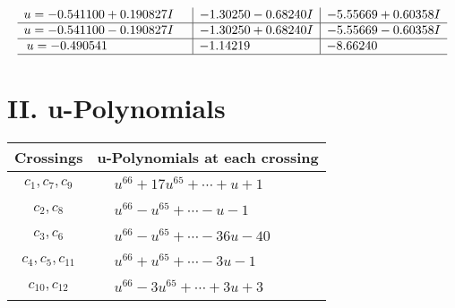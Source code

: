 \documentclass[1p]{elsarticle_modified}
\theoremstyle{definition}
\begin{document}
$$\begin{array}{c|c|c}
\begin{aligned}
u &= -0.541100 + 0.190827 I\end{aligned}
 & -1.30250 - 0.68240 I & -5.55669 + 0.60358 I \\ \hline\begin{aligned}
u &= -0.541100 - 0.190827 I\end{aligned}
 & -1.30250 + 0.68240 I & -5.55669 - 0.60358 I \\ \hline\begin{aligned}
u &= -0.490541\phantom{ +0.000000I}\end{aligned}
 & -1.14219\phantom{ +0.000000I} & -8.66240\phantom{ +0.000000I}\\
 \hline 
 \end{array}$$\newpage
\newpage\renewcommand{\arraystretch}{1}
\centering \section*{ II. u-Polynomials}
\begin{tabular}{m{50pt}|m{274pt}}
Crossings & \hspace{64pt}u-Polynomials at each crossing \\
\hline $$\begin{aligned}c_{1},c_{7},c_{9}\end{aligned}$$&$\begin{aligned}
&u^{66}+17 u^{65}+\cdots+u+1
\end{aligned}$\\
\hline $$\begin{aligned}c_{2},c_{8}\end{aligned}$$&$\begin{aligned}
&u^{66}- u^{65}+\cdots- u-1
\end{aligned}$\\
\hline $$\begin{aligned}c_{3},c_{6}\end{aligned}$$&$\begin{aligned}
&u^{66}- u^{65}+\cdots-36 u-40
\end{aligned}$\\
\hline $$\begin{aligned}c_{4},c_{5},c_{11}\end{aligned}$$&$\begin{aligned}
&u^{66}+u^{65}+\cdots-3 u-1
\end{aligned}$\\
\hline $$\begin{aligned}c_{10},c_{12}\end{aligned}$$&$\begin{aligned}
&u^{66}-3 u^{65}+\cdots+3 u+3
\end{aligned}$\\
\hline
\end{tabular}\newpage\renewcommand{\arraystretch}{1}
\end{document}
